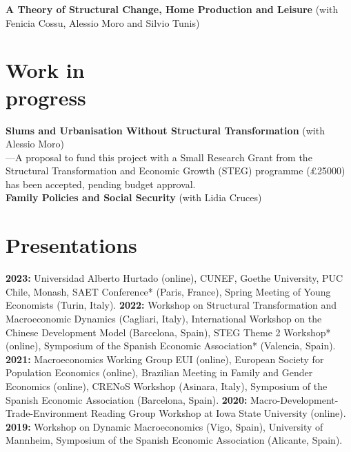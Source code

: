 \documentclass[margin]{res} %
\begin{document}
\begin{resume}

{\bf A Theory of Structural Change, Home Production and Leisure} (with Fenicia Cossu, Alessio Moro and Silvio Tunis) 

\section{Work in \\ progress}
{\bf Slums and Urbanisation Without Structural Transformation} (with Alessio Moro) \\
---A proposal to fund this project with a Small Research Grant from the Structural Transformation and Economic Growth (STEG) programme (£25000) has been accepted, pending budget approval. \\
{\bf Family Policies and Social Security} (with Lidia Cruces)

\section{Presentations}

{\bf 2023:} Universidad Alberto Hurtado (online), CUNEF, Goethe University, PUC Chile, Monash, SAET Conference* (Paris, France), Spring Meeting of Young Economists (Turin, Italy). {\bf 2022:} Workshop on Structural Transformation and Macroeconomic Dynamics (Cagliari, Italy), International Workshop on the Chinese Development Model (Barcelona, Spain), STEG Theme 2 Workshop* (online), Symposium of the Spanish Economic Association* (Valencia, Spain). {\bf 2021:} Macroeconomics Working Group EUI (online), European Society for Population Economics (online), Brazilian Meeting in Family and Gender Economics (online), CRENoS Workshop (Asinara, Italy), Symposium of the Spanish Economic Association (Barcelona, Spain). {\bf 2020:} Macro-Development-Trade-Environment Reading Group Workshop at Iowa State University (online). {\bf 2019:} Workshop on Dynamic Macroeconomics (Vigo, Spain), University of Mannheim, Symposium of the Spanish Economic Association (Alicante, Spain).


\end{resume}
\end{document}

